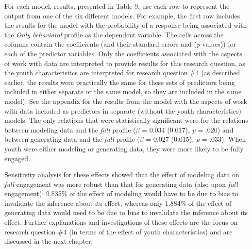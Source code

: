 \documentclass[]{book}
\theoremstyle{definition}
\theoremstyle{definition}
\theoremstyle{definition}
\theoremstyle{remark}
\begin{document}
For each model, results, presented in Table 9, use each row to represent
the output from one of the six different models. For example, the first
row includes the results for the model with the probability of a
response being associated with the \emph{Only behavioral} profile as the
dependent variable. The cells across the columns contain the
coefficients (and their standard errors and (\emph{p}-values)) for each
of the predictor variables. Only the coefficients associated with the
aspects of work with data are interpreted to provide results for this
research question, as the youth characteristics are interpreted for
research question \#4 (as described earlier, the results were
practically the same for these sets of predictors being included in
either separate or the same model, so they are included in the same
model). See the appendix for the results from the model with the aspects
of work with data included as predictors in separate (without the youth
characteristics) models. The only relations that were statistically
significant were for the relations between modeling data and the
\emph{full} profile (\(\beta\) = 0.034 (0.017), \emph{p} = .020) and
between generating data and the \emph{full} profile (\(\beta\) = 0.027
(0.015), \emph{p} = .033): When youth were either modeling or generating
data, they were more likely to be fully engaged.

Sensitivity analysis for these effects showed that the effect of
modeling data on \emph{full} engagement was more robust than that for
generating data (also upon \emph{full} engagement): 9.835\% of the
effect of modeling would have to be due to bias to invalidate the
inference about its effect, whereas only 1.884\% of the effect of
generating data would need to be due to bias to invalidate the inference
about its effect. Further explanations and investigations of these
effects are the focus on research question \#4 (in terms of the effect
of youth characteristics) and are discussed in the next chapter.
\end{document}
